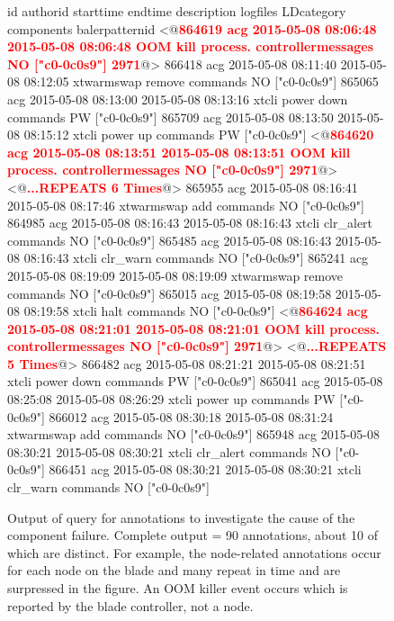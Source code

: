 \begin{figure*}
\begin{annol}
id	authorid	starttime	endtime	description	logfiles	LDcategory	components	balerpatternid
<@\textbf{\textcolor{red}{864619	acg	2015-05-08 08:06:48	2015-05-08 08:06:48	OOM kill process.		controllermessages	NO	["c0-0c0s9"]	2971}}@>
866418	acg	2015-05-08 08:11:40	2015-05-08 08:12:05	xtwarmswap remove	commands	NO	["c0-0c0s9"]
865065	acg	2015-05-08 08:13:00	2015-05-08 08:13:16	xtcli power down	commands	PW	["c0-0c0s9"]
865709	acg	2015-05-08 08:13:50	2015-05-08 08:15:12	xtcli power up	commands	PW	["c0-0c0s9"]
<@\textbf{\textcolor{red}{864620	acg	2015-05-08 08:13:51     2015-05-08 08:13:51	OOM kill process.		controllermessages	NO	["c0-0c0s9"]	2971}}@>
<@\textbf{\textcolor{red}{...REPEATS 6 Times}}@>
865955	acg	2015-05-08 08:16:41	2015-05-08 08:17:46	xtwarmswap add	commands	NO	["c0-0c0s9"]
864985	acg	2015-05-08 08:16:43	2015-05-08 08:16:43	xtcli clr_alert	commands	NO	["c0-0c0s9"]
865485	acg	2015-05-08 08:16:43	2015-05-08 08:16:43	xtcli clr_warn	commands	NO	["c0-0c0s9"]
865241	acg	2015-05-08 08:19:09	2015-05-08 08:19:09	xtwarmswap remove	commands	NO	["c0-0c0s9"]
865015	acg	2015-05-08 08:19:58	2015-05-08 08:19:58	xtcli halt	commands	NO	["c0-0c0s9"]
<@\textbf{\textcolor{red}{864624	acg	2015-05-08 08:21:01	2015-05-08 08:21:01	OOM kill process.	controllermessages	NO	["c0-0c0s9"]	2971}}@>
<@\textbf{\textcolor{red}{...REPEATS 5 Times}}@>
866482	acg	2015-05-08 08:21:21	2015-05-08 08:21:51	xtcli power down	commands	PW	["c0-0c0s9"]
865041	acg	2015-05-08 08:25:08	2015-05-08 08:26:29	xtcli power up	commands	PW	["c0-0c0s9"]
866012	acg	2015-05-08 08:30:18	2015-05-08 08:31:24	xtwarmswap add	commands	NO	["c0-0c0s9"]
865948	acg	2015-05-08 08:30:21	2015-05-08 08:30:21	xtcli clr_alert	commands	NO	["c0-0c0s9"]
866451	acg	2015-05-08 08:30:21	2015-05-08 08:30:21	xtcli clr_warn	commands	NO	["c0-0c0s9"]
\end{annol}
\caption{Output of query for annotations to investigate the cause of the component failure. Complete output = 90 annotations, about 10 of which are distinct. For example, the
node-related annotations occur for each node on the blade and many repeat in time and are surpressed in the figure. An OOM killer event occurs which is reported by the blade
controller, not a node.}
\label{f:c0-0c0s9q}
\end{figure*}


